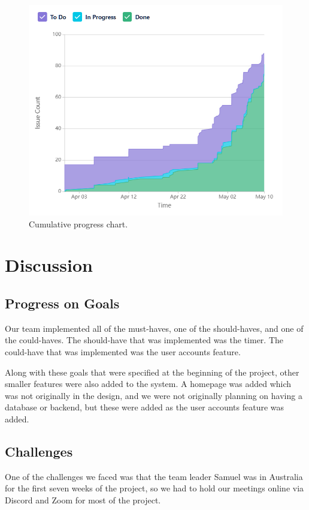 \documentclass[conference]{IEEEtran}
\begin{document}
\begin{figure}[htbp]
\centerline{\includegraphics[width = \linewidth]{cumulative-flow-diagram.png}}
\caption{Cumulative progress chart.}
\label{progress}
\end{figure}

\section{Discussion}
\subsection{Progress on Goals}
Our team implemented all of the must-haves, one of the should-haves, and one of the could-haves. The should-have that was implemented was the timer. The could-have that was implemented was the user accounts feature.

Along with these goals that were specified at the beginning of the project, other smaller features were also added to the system. A homepage was added which was not originally in the design, and we were not originally planning on having a database or backend, but these were added as the user accounts feature was added.


\subsection{Challenges}
One of the challenges we faced was that the team leader Samuel was in Australia for the first seven weeks of the project, so we had to hold our meetings online via Discord and Zoom for most of the project.
\end{document}
